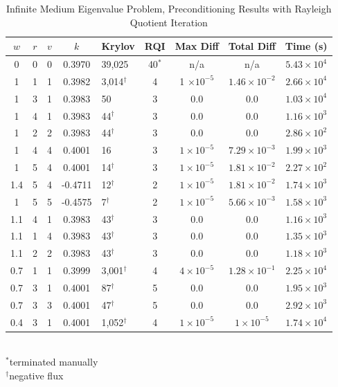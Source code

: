 \begin{table}[!h]
\caption{Infinite Medium Eigenvalue Problem, Preconditioning Results with Rayleigh Quotient Iteration}
\begin{center}
\begin{tabular}{| c | c | c | c | l | c | c | c | c |}
\hline
$w$ & $r$ & $v$ & $k$ & Krylov & RQI & Max Diff & Total Diff & Time (s) \\[0.5ex]
\hline
0    & 0 & 0 & 0.3970 & 39,025              & 40$^{*}$  & n/a & n/a & $5.43 \times 10^{4}$ \\
1    & 1 & 1 & 0.3982 & 3,014$^{\dag}$ & 4 & 1 $\times 10^{-5}$ & $1.46 \times 10^{-2}$ & $2.66 \times 10^{4}$ \\
1    & 3 & 1 & 0.3983 & 50                     & 3 & 0.0 & 0.0 & $1.03 \times 10^{4}$ \\
1    & 4 & 1 & 0.3983 & 44$^{\dag}$      & 3 & 0.0 & 0.0 & $1.16 \times 10^{3}$ \\
1    & 2 & 2 & 0.3983 & 44$^{\dag}$      & 3 & 0.0 & 0.0 & $2.86 \times 10^{2}$ \\
1    & 4 & 4 & 0.4001 & 16                     & 3 & $1 \times 10^{-5}$ & $7.29 \times 10^{-3}$ & $1.99 \times 10^{3}$ \\
1    & 5 & 4 & 0.4001 & 14$^{\dag}$     & 3 & $1 \times 10^{-5}$ & $1.81 \times 10^{-2}$ & $2.27 \times 10^{2}$ \\
1.4 & 5 & 4 & -0.4711 & 12$^{\dag}$    & 2 & $1 \times 10^{-5}$ & $1.81 \times 10^{-2}$ & $1.74 \times 10^{3}$ \\
1    & 5 & 5 & -0.4575 & 7$^{\dag}$      & 2 & $1 \times 10^{-5}$ & $5.66 \times 10^{-3}$ & $1.58 \times 10^{3}$ \\
\hline
1.1 & 4 & 1 & 0.3983 & 43$^{\dag}$      & 3 & 0.0 & 0.0 & $1.16 \times 10^{3}$ \\
1.1 & 1 & 4 & 0.3983 & 43$^{\dag}$      & 3 & 0.0 & 0.0 & $1.35 \times 10^{3}$ \\
1.1 & 2 & 2 & 0.3983 & 43$^{\dag}$      & 3 & 0.0 & 0.0 & $1.18 \times 10^{3}$ \\
\hline
0.7 & 1 & 1 & 0.3999 & 3,001$^{\dag}$ & 4 & $4 \times 10^{-5}$ & $1.28 \times 10^{-1}$ & $2.25 \times 10^{4}$ \\
0.7 & 3 & 1 & 0.4001 & 87$^{\dag}$      & 5 & 0.0 & 0.0 & $1.95 \times 10^{3}$ \\
0.7 & 3 & 3 & 0.4001 & 47$^{\dag}$      & 5 & 0.0 & 0.0 & $2.92 \times 10^{3}$ \\
0.4 & 3 & 1 & 0.4001 & 1,052$^{\dag}$ & 4 & $1 \times 10^{-5}$ & $1 \times 10^{-5}$      & $1.74 \times 10^{4}$ \\
\hline 
\end{tabular}\\
$^{*}$terminated manually\\
$^{\dag}$negative flux
\end{center}
\label{table:impi RQI}
\end{table}
